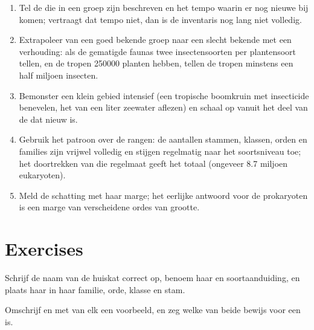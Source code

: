 \begin{method}\label{met:b1:classifying-biodiversity:estimate}
\begin{enumerate}
  \item Tel de  die in een groep zijn beschreven en het tempo
        waarin er nog nieuwe bij komen; vertraagt dat tempo niet, dan is
        de inventaris nog lang niet volledig.
  \item Extrapoleer van een goed bekende groep naar een slecht bekende
        met een verhouding: als de gematigde faunas twee insectensoorten
        per plantensoort tellen, en de tropen \num{250000} planten
        hebben, tellen de tropen minstens een half miljoen insecten.
  \item Bemonster een klein gebied intensief (een tropische boomkruin met
        insecticide benevelen, het  van een liter zeewater aflezen) en
        schaal op vanuit het deel van de  dat nieuw is.
  \item Gebruik het patroon over de rangen: de aantallen stammen,
        klassen, orden en families zijn vrijwel volledig en stijgen
        regelmatig naar het soortsniveau toe; het doortrekken van die
        regelmaat geeft het totaal (ongeveer \num{8.7} miljoen
        eukaryoten).
  \item Meld de schatting met haar marge; het eerlijke antwoord voor de
        prokaryoten is een marge van verscheidene ordes van grootte.
\end{enumerate}
\end{method}

\section{Exercises}

\begin{exercise}[$\star$]\label{exo:b1:classifying-biodiversity:1}
Schrijf de naam van de huiskat correct op, benoem haar  en
soortaanduiding, en plaats haar in haar familie, orde, klasse en stam.
\end{exercise}

\begin{exercise}[$\star$]\label{exo:b1:classifying-biodiversity:2}
Omschrijf  en  met van elk een voorbeeld, en zeg welke van
beide bewijs voor een  is.
\end{exercise}


